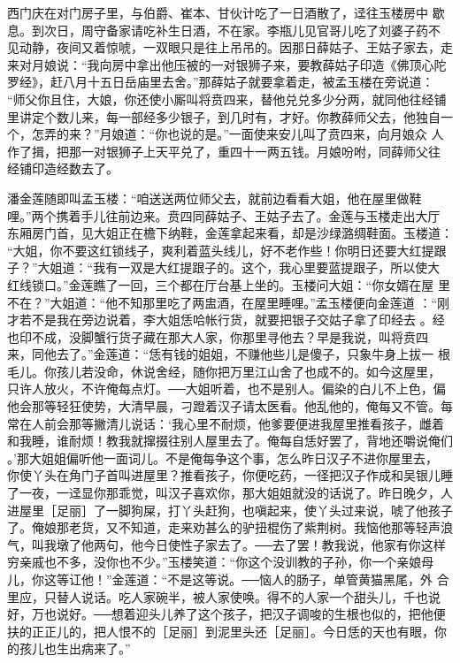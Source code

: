 西门庆在对门房子里，与伯爵、崔本、甘伙计吃了一日酒散了，迳往玉楼房中
歇息。到次日，周守备家请吃补生日酒，不在家。李瓶儿见官哥儿吃了刘婆子药不
见动静，夜间又着惊唬，一双眼只是往上吊吊的。因那日薛姑子、王姑子家去，走
来对月娘说：“我向房中拿出他压被的一对银狮子来，要教薛姑子印造《佛顶心陀
罗经》，赶八月十五日岳庙里去舍。”那薛姑子就要拿着走，被孟玉楼在旁说道：
“师父你且住，大娘，你还使小厮叫将贲四来，替他兑兑多少分两，就同他往经铺
里讲定个数儿来，每一部经多少银子，到几时有，才好。你教薛师父去，他独自一
个，怎弄的来？”月娘道：“你也说的是。”一面使来安儿叫了贲四来，向月娘众
人作了揖，把那一对银狮子上天平兑了，重四十一两五钱。月娘吩咐，同薛师父往
经铺印造经数去了。

潘金莲随即叫孟玉楼：“咱送送两位师父去，就前边看看大姐，他在屋里做鞋
哩。”两个携着手儿往前边来。贲四同薛姑子、王姑子去了。金莲与玉楼走出大厅
东厢房门首，见大姐正在檐下纳鞋，金莲拿起来看，却是沙绿潞绸鞋面。玉楼道：
“大姐，你不要这红锁线子，爽利着蓝头线儿，好不老作些！你明日还要大红提跟
子？”大姐道：“我有一双是大红提跟子的。这个，我心里要蓝提跟子，所以使大
红线锁口。”金莲瞧了一回，三个都在厅台基上坐的。玉楼问大姐：“你女婿在屋
里不在？”大姐道：“他不知那里吃了两盅酒，在屋里睡哩。”孟玉楼便向金莲道
：“刚才若不是我在旁边说着，李大姐恁哈帐行货，就要把银子交姑子拿了印经去
。经也印不成，没脚蟹行货子藏在那大人家，你那里寻他去？早是我说，叫将贲四
来，同他去了。”金莲道：“恁有钱的姐姐，不赚他些儿是傻子，只象牛身上拔一
根毛儿。你孩儿若没命，休说舍经，随你把万里江山舍了也成不的。如今这屋里，
只许人放火，不许俺每点灯。──大姐听着，也不是别人。偏染的白儿不上色，偏
他会那等轻狂使势，大清早晨，刁蹬着汉子请太医看。他乱他的，俺每又不管。每
常在人前会那等撇清儿说话：‘我心里不耐烦，他爹要便进我屋里推看孩子，雌着
和我睡，谁耐烦！教我就撺掇往别人屋里去了。俺每自恁好罢了，背地还嚼说俺们
。’那大姐姐偏听他一面词儿。不是俺每争这个事，怎么昨日汉子不进你屋里去，
你使丫头在角门子首叫进屋里？推看孩子，你便吃药，一径把汉子作成和吴银儿睡
了一夜，一迳显你那乖觉，叫汉子喜欢你，那大姐姐就没的话说了。昨日晚夕，人
进屋里［足丽］了一脚狗屎，打丫头赶狗，也嗔起来，使丫头过来说，唬了他孩子
了。俺娘那老货，又不知道，走来劝甚么的驴扭棍伤了紫荆树。我恼他那等轻声浪
气，叫我墩了他两句，他今日使性子家去了。──去了罢！教我说，他家有你这样
穷亲戚也不多，没你也不少。”玉楼笑道：“你这个没训教的子孙，你一个亲娘母
儿，你这等讧他！”金莲道：“不是这等说。──恼人的肠子，单管黄猫黑尾，外
合里应，只替人说话。吃人家碗半，被人家使唤。得不的人家一个甜头儿，千也说
好，万也说好。──想着迎头儿养了这个孩子，把汉子调唆的生根也似的，把他便
扶的正正儿的，把人恨不的［足丽］到泥里头还［足丽］。今日恁的天也有眼，你
的孩儿也生出病来了。”

